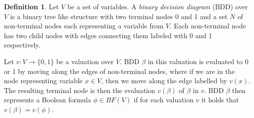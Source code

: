 \documentclass[
  digital, %
  twoside, %
  table,   %
  nolof,     %
  nolot,     %
]{fithesis3}
\theoremstyle{definition}
\newtheorem{definition}{Definition}
\theoremstyle{remark}
\newcommand{\BF}[1]{BF(#1)}
\begin{document}
\begin{definition}
  Let $V$ be a set of variables. A \emph{binary decision diagram} (BDD) over $V$ is a binary tree like structure with two terminal nodes 0 and 1 and a set $N$ of non-terminal nodes each representing a variable from $V$. Each non-terminal node has two child nodes with edges connecting them labeled with 0 and 1 respectively.
\end{definition}


Let $v\colon V \to \{0,1\}$ be a valuation over $V$. BDD $\beta$ in this valuation is evaluated to 0 or 1 by moving along the edges of non-terminal nodes, where if we are in the node representing variable $x \in V$, then we move along the edge labelled by $v(x)$. The resulting terminal node is then the evaluation $v(\beta)$ of $\beta$ in $v$. BDD $\beta$ then represents a Boolean formula $\phi \in \BF{V}$ if for each valuation $v$ it holds that $v(\beta) = v(\phi)$.
\end{document}
